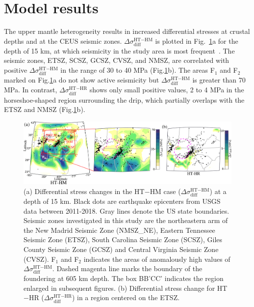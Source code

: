 \documentclass[draft,linenumbers]{agujournal2018}
\begin{document}
\section{Model results}
%
The upper mantle heterogeneity results in increased differential stresses at crustal depths and at the CEUS seismic zones. $\Delta \sigma_{\text{diff}}^{\text{HT}-\text{HM}}$
is plotted in Fig.~\ref{df_model}a for the depth of 15 km, at which seismicity in the study area is most frequent~\citep[e.g.,][]{mazzotti2010state}. The seismic zones, ETSZ, SCSZ, GCSZ, CVSZ, and NMSZ, are correlated with positive $\Delta \sigma_{\text{diff}}^{\text{HT}-\text{HM}}$ in the range of 30 to 40 MPa (Fig.\ref{df_model}b). The areas F$_{1}$ and F$_{2}$ marked on Fig.\ref{df_model}a do not show active seismicity but $\Delta \sigma_{\text{diff}}^{\text{HT}-\text{HM}}$ is greater than 70 MPa. In contrast, $\Delta\sigma_{\text{diff}}^{\text{HT}-\text{HR}}$ shows only small positive values, 2 to 4 MPa in the horseshoe-shaped region surrounding the drip, which partially overlaps with the ETSZ and NMSZ (Fig.\ref{df_model}b).
%
\begin{figure}[h!]
    \centering
    \includegraphics[width=\linewidth]{figures/diff_stress_model.png}
    \caption{(a) Differential stress changes in the HT$-$HM case ($\Delta \sigma_{\text{diff}}^{\text{HT}-\text{HM}}$) at a depth of 15 km. Black dots are earthquake epicenters from USGS data between 2011-2018. Gray lines denote the US state boundaries. Seismic zones investigated in this study are the northeastern arm of the New Madrid Seismic Zone (NMSZ\_NE), Eastern Tennessee Seismic Zone (ETSZ), South Carolina Seismic Zone (SCSZ), Giles County Seismic Zone (GCSZ) and Central Virginia Seismic Zone (CVSZ). F$_1$ and F$_2$ indicates the areas of anomalously high values of $\Delta \sigma_{\text{diff}}^{\text{HT}-\text{HM}}$. Dashed magenta line marks the boundary of the foundering at 605 km depth. The box BB'CC' indicates the region enlarged in subsequent figures. (b) Differential stress change for HT$-$HR ($\Delta \sigma_{\text{diff}}^{\text{HT}-\text{HR}}$) in a region centered on the ETSZ. }
    \label{df_model}
\end{figure}
\end{document}

